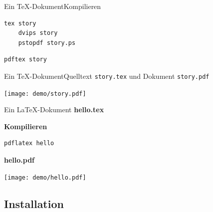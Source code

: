 \begin{Frame}[fragile]{Ein \TeX-Dokument}{Kompilieren}
  \begin{lstlisting}[language={},morekeywords={tex,dvips,pstopdf},gobble=4]
    tex story
    dvips story
    pstopdf story.ps
  \end{lstlisting}

  \xxx
  \pause


  \begin{lstlisting}[language={},morekeywords={pdftex},gobble=4]
    pdftex story
  \end{lstlisting}
\end{Frame}

\begin{Frame}[t]{Ein \TeX-Dokument}{Quelltext \texttt{story.tex} und Dokument \texttt{story.pdf}}
  

  \begin{center}
    \texttt{[image: demo/story.pdf]}
  \end{center}
\end{Frame}

\begin{Frame}[fragile,t]{Ein \LaTeX-Dokument}
  \textbf{\ttfamily\color{maincolor}hello.tex}
  

  \pause
  \xxx

  \textbf{\color{maincolor}Kompilieren}
  \begin{lstlisting}[language={},morekeywords={pdflatex},gobble=4]
    pdflatex hello
  \end{lstlisting}

  \pause
  \xxx

  \textbf{\ttfamily\color{maincolor}hello.pdf}
  \begin{center}
    \texttt{[image: demo/hello.pdf]}
  \end{center}
\end{Frame}

\subsection{Installation}

